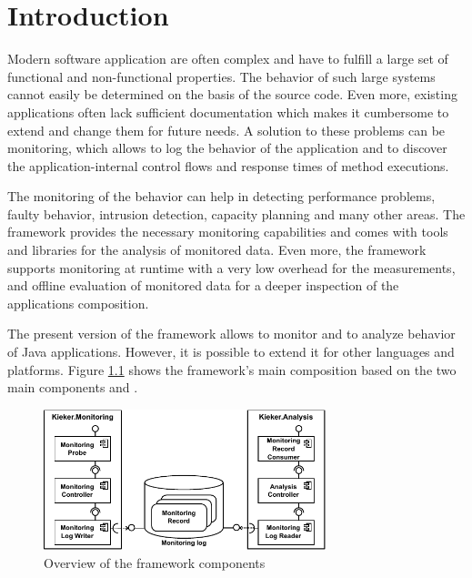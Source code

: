% 


\chapter{Introduction}\label{chap:introduction}

Modern software application are often complex and have to fulfill a large set of functional and non-functional properties. The behavior of such large systems cannot easily be determined on the basis of the source code. Even more, existing applications often lack sufficient documentation which makes it cumbersome to extend and change them for future needs. A solution to these problems can be monitoring, which allows to log the behavior of the application and to discover the application-internal control flows and response times of method executions.

The monitoring of the behavior can help in detecting performance problems, faulty behavior, intrusion detection, capacity planning and many other areas. The \Kieker{} framework provides the necessary monitoring capabilities and comes with tools and libraries for the analysis of monitored data. Even more, the framework supports monitoring at runtime with a very low overhead for the measurements, and offline evaluation of monitored data for a deeper inspection of the applications composition. 

The present version of the \Kieker{} framework allows to monitor and to analyze behavior of Java applications. However, it is possible to extend it for other languages and platforms. Figure \ref{fig:KiekerComponentDiagram} shows the framework's main composition based on the two main components \KiekerMonitoringPart{} and \KiekerAnalysisPart{}. 

\begin{figure}[H]\centering
\includegraphics[width=0.73\textwidth]{images/kiekerComponentDiagram-woCloud-bw-w-record-newNames}
\caption{Overview of the framework components}
\label{fig:KiekerComponentDiagram}
\end{figure}
		
